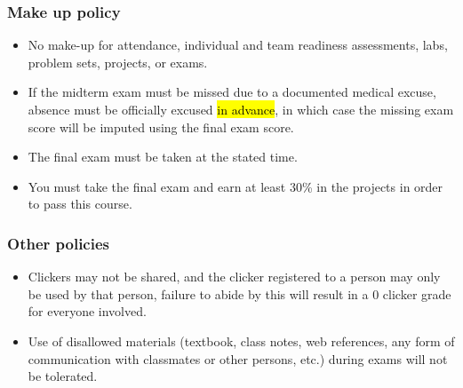 \documentclass[11pt,containsverbatim,handout,xcolor=xelatex,dvipsnames,table]{beamer}
\begin{document}
\begin{frame}
\frametitle{Make up policy}

\begin{itemize}

\item No make-up for attendance, individual and team readiness assessments, labs, 
problem sets, projects, or exams.

\item If the midterm exam must be missed due to a documented medical excuse, absence 
must be officially excused \hl{in advance}, in which case the missing exam score will 
be imputed using the final exam score.

\item The final exam must be taken at the stated time.

\item You must take the final exam and earn at least 30\% in the projects in order to 
pass this course.

\end{itemize}


\end{frame}


\begin{frame}
\frametitle{Other policies}

\begin{itemize}

\item Clickers may not be shared, and the clicker registered to a person may only be 
used by that person, failure to abide by this will result in a 0 clicker grade for 
everyone involved.

\item Use of disallowed materials (textbook, class notes, web references, any form of 
communication with classmates or other persons, etc.) during exams will not be 
tolerated.

\end{itemize}


\end{frame}

\end{document}
